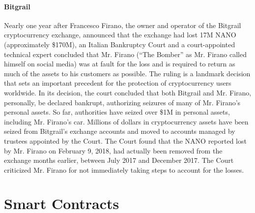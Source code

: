 \paragraph{Bitgrail} Nearly one year after Francesco Firano, the owner and operator of the Bitgrail cryptocurrency exchange, announced that the exchange had lost 17M NANO (approximately \$170M), an Italian Bankruptcy Court and a court-appointed technical expert concluded that Mr. Firano (``The Bomber'' as Mr. Firano called himself on social media) was at fault for the loss and is required to return as much of the assets to his customers as possible. The ruling is a landmark decision that sets an important precedent for the protection of cryptocurrency users worldwide. In its decision, the court concluded that both Bitgrail and Mr. Firano, personally, be declared bankrupt, authorizing seizures of many of Mr. Firano's personal assets. So far, authorities have seized over \$1M in personal assets, including Mr. Firano's car. Millions of dollars in cryptocurrency assets have been seized from Bitgrail's exchange accounts and moved to accounts managed by trustees appointed by the Court. The Court found that the NANO reported lost by Mr. Firano on February 9, 2018, had actually been removed from the exchange months earlier, between July 2017 and December 2017. The Court criticized Mr. Firano for not immediately taking steps to account for the losses.

\section{Smart Contracts}

